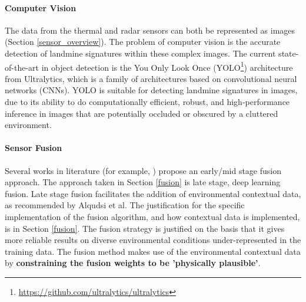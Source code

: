     \paragraph{Computer Vision} 

        The data from the thermal and radar sensors can both be represented as images (Section \ref{sensor_overview}). The problem of computer vision is the accurate detection of landmine signatures within these complex images. The current state-of-the-art in object detection is the You Only Look Once (YOLO\footnote{\url{https://github.com/ultralytics/ultralytics}}) architecture from Ultralytics, which is a family of architectures based on convolutional neural networks (CNNs). YOLO is suitable for detecting landmine signatures in images, due to its ability to do computationally efficient, robust, and high-performance inference in images that are potentially occluded or obscured by a cluttered environment.
    
    \paragraph{Sensor Fusion} 
    
        \noindent Several works in literature (for example, \cite{qui2023fusion}) propose an early/mid stage fusion approach. The approach taken in Section \ref{fusion} is late stage, deep learning fusion. Late stage fusion facilitates the addition of environmental contextual data, as recommended by Alqudsi et al. The justification for the specific implementation of the fusion algorithm, and how contextual data is implemented, is in Section \ref{fusion}. The fusion strategy is justified on the basis that it gives more reliable results on diverse environmental conditions under-represented in the training data. The fusion method makes use of the environmental contextual data by \textbf{constraining the fusion weights to be 'physically plausible'}.
    


